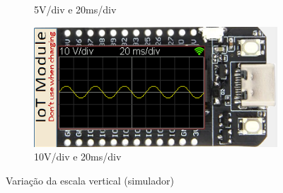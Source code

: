 \begin{figure}[H]
\begin{subfigure}{0.35\textwidth}
        \captionsetup{justification=centering}
        \caption{5V/div e 20ms/div}
        \label{fig:5V/div e 20ms/div simulador}
    \end{subfigure}
    \begin{subfigure}{0.35\textwidth}
        \centering
        \includegraphics[width=1\linewidth]{Imagens/Testes no simulador/Vertical 10V.png}
        \captionsetup{justification=centering}
        \caption{10V/div e 20ms/div}
        \label{fig:10V/div e 20ms/div vertical simulador}
    \end{subfigure}
    \captionsetup{justification=centering}
    \caption{Variação da escala vertical (simulador)}
    \label{fig:Variação da escala vertical (simulador)}
\end{figure}

\phantom{test}

\vspace{1cm}

